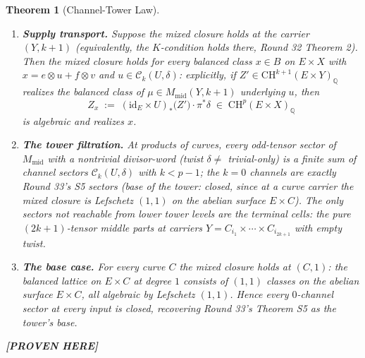 \documentclass[11pt]{article}
\newtheorem{theorem}{Theorem}
\newcommand{\PROVEN}{\textbf{[PROVEN HERE]}}
\newcommand{\Q}{\mathbb{Q}}
\newcommand{\CH}{\mathrm{CH}}
\begin{document}
\begin{theorem}[Channel-Tower Law]\label{thm:s7}
\begin{enumerate}[label=(\roman*)]
\item \textbf{Supply transport.} Suppose the mixed closure holds at the
carrier $(Y,k+1)$ (equivalently, the $K$-condition holds there, Round 32
Theorem 2). Then the mixed closure holds for every balanced class
$x\in B$ on $E\times X$ with $x=e\otimes u+f\otimes v$ and
$u\in\mathcal{C}_k(U,\delta)$: explicitly, if
$Z'\in\CH^{k+1}(E\times Y)_\Q$ realizes the balanced class of
$\mu\in M_{\mathrm{mid}}(Y,k+1)$ underlying $u$, then
\[
Z_x\;:=\;(\mathrm{id}_E\times U)_*\bigl(Z'\bigr)\cdot
\pi^*\delta\;\in\;\CH^{p}(E\times X)_\Q
\]
is algebraic and realizes $x$.
\item \textbf{The tower filtration.} At products of curves, every
odd-tensor sector of $M_{\mathrm{mid}}$ with a nontrivial divisor-word
(twist $\delta\ne$ trivial-only) is a finite sum of channel sectors
$\mathcal{C}_k(U,\delta)$ with $k<p-1$; the $k=0$ channels are exactly
Round 33's S5 sectors (base of the tower: closed, since at a curve
carrier the mixed closure is Lefschetz $(1,1)$ on the abelian surface
$E\times C$). The only sectors not reachable from lower tower levels are
the \emph{terminal cells}: the pure $(2k+1)$-tensor middle parts at
carriers $Y=C_{i_1}\times\cdots\times C_{i_{2k+1}}$ with empty twist.
\item \textbf{The base case.} For every curve $C$ the mixed closure holds
at $(C,1)$: the balanced lattice on $E\times C$ at degree $1$ consists of
$(1,1)$ classes on the abelian surface $E\times C$, all algebraic by
Lefschetz $(1,1)$. Hence every $0$-channel sector at every input is
closed, recovering Round 33's Theorem S5 as the tower's base.
\end{enumerate}
\PROVEN{}
\end{theorem}
\end{document}

